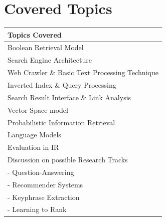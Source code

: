\documentclass{article}
\begin{document}
\section{Covered Topics}
\label{appB}

\begin{table}[h]
\centering
\small
\begin{tabular}{|l|}
\hline
 Topics Covered \\\hline

         Boolean Retrieval Model \\
         Search Engine Architecture\\
	     Web Crawler \& Basic Text Processing Technique\\
         Inverted Index \& Query Processing \\
	     Search Result Interface \& Link Analysis\\
	     Vector Space model \\
	     Probabilistic Information Retrieval\\
	     Language Models\\
         Evaluation in IR\\
	     Discussion on possible Research Tracks \\
	      - Question-Answering\\
	      - Recommender Systems\\
	      - Keyphrase Extraction\\
	      - Learning to Rank\\
	     \hline     
\end{tabular}	      
\end{table}%
\end{document}

